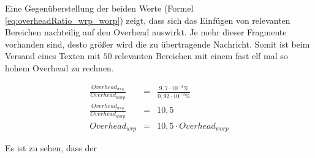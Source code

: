 Eine Gegenüberstellung der beiden Werte (Formel \ref{eq:overheadRatio_wrp_worp})
zeigt, dass sich das Einfügen von relevanten Bereichen nachteilig auf den
Overhead auswirkt. Je mehr dieser Fragmente vorhanden sind, desto größer wird
die zu übertragende Nachricht. Somit ist beim Versand eines Texten mit $50$
relevanten Bereichen mit einem fast elf mal so hohem Overhead zu rechnen.

\begin{eqnarray} 
	\frac{ Overhead_{wrp} }{ Overhead_{worp} } & = & \frac{9,7 \cdot 10^{-3} \%}{0,92 \cdot 10^{-3} \%} \\
	\frac{ Overhead_{wrp} }{ Overhead_{worp} } & = & 10,5 \\ 
	Overhead_{wrp} & = & 10,5 \cdot Overhead_{worp}
	\label{eq:overheadRatio_wrp_worp}
\end{eqnarray}

Es ist zu sehen, dass der 